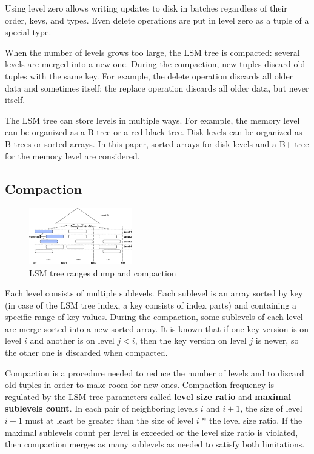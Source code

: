 \documentclass{vldb}
\begin{document}
Using level zero allows writing updates to disk in batches regardless of
their order, keys, and types. Even delete operations are put in level zero as a tuple of a
special type.

When the number of levels grows too large, the LSM tree is compacted: several levels are
merged into a new one. During the compaction, new tuples discard old tuples with the same
key. For example, the delete operation discards all older data and sometimes itself; the replace
operation discards all older data, but never itself.

The LSM tree can store levels in multiple ways. For example, the memory level can be
organized as a B-tree or a red-black tree. Disk levels can be organized as B-trees or sorted
arrays. In this paper, sorted arrays for disk levels and a B+ tree for the memory level
are considered.

\subsection{Compaction}
\begin{figure}
\centering
\includegraphics[width=0.4\textwidth]{compaction_schema}
\caption{LSM tree ranges dump and compaction}
\label{fig:compaction_schema}
\end{figure}
Each level consists of multiple sublevels. Each sublevel is an array sorted by
key (in case of the LSM tree index, a key consists of index parts) and
containing a specific range of key values. During the compaction, some sublevels of each
level are merge-sorted into a new sorted array. It is known that if one key
version is on level $i$ and another is on level $j < i$, then the key version on level
$j$ is newer, so the other one is discarded when compacted.

Compaction is a procedure needed to reduce the number of levels and to discard old tuples
in order to make room for new ones. Compaction frequency is regulated by the LSM tree
parameters called \textbf{level size ratio} and \textbf{maximal sublevels count}. In each pair of
neighboring levels $i$ and $i + 1$, the size of level $i + 1$ must at least be greater than
the size of level $i$ $*$ the level size ratio. If the maximal sublevels count per
level is exceeded or the level size ratio is violated, then compaction merges as many
sublevels as needed to satisfy both limitations.
\end{document}

